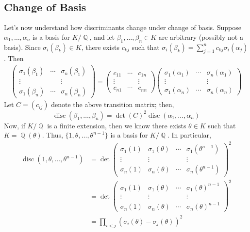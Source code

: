 \documentclass[11pt, a4paper]{memoir}
\DeclareMathOperator{\Q}{{\mathbb{Q}}}
\theoremstyle{change}
\theoremstyle{plain}
\theoremstyle{nonumberplain}
\DeclareMathOperator{\disc}{disc}
\numberwithin{equation}{section}
\begin{document}
\subsection{Change of Basis}
Let's now understand how discriminants change under change of basis.
Suppose $\alpha_1,\ldots,\alpha_n$ is a basis for $K/\Q$, and let $\beta_1,\ldots,\beta_n\in K$ are arbitrary (possibly not a basis).
Since $\sigma_i(\beta_k)\in K$, there exists $c_{kj}$ such that $\sigma_i(\beta_k)=\sum_{j=1}^n c_{kj}\sigma_i(\alpha_j)$.
Then
\begin{align*}
    \begin{pmatrix}
        \sigma_1(\beta_1) &\cdots&\sigma_n(\beta_1)\\
        \vdots&&\vdots\\
        \sigma_1(\beta_n)&\cdots&\sigma_n(\beta_n)
    \end{pmatrix}
    =
    \begin{pmatrix}
        c_{11} &\cdots&c_{1n}\\
        \vdots&&\vdots\\
        c_{n1}&\cdots&c_{nn}
    \end{pmatrix}
    \begin{pmatrix}
        \sigma_1(\alpha_1) &\cdots&\sigma_n(\alpha_1)\\
        \vdots&&\vdots\\
        \sigma_1(\alpha_n)&\cdots&\sigma_n(\alpha_n)
    \end{pmatrix}
\end{align*}
Let $C=\left(c_{ij}\right)$ denote the above transition matrix; then,
\begin{equation*}
    \disc(\beta_1,\ldots,\beta_n)=\det(C)^2\disc(\alpha_1,\ldots,\alpha_n)
\end{equation*}
Now, if $K/\Q$ is a finite extension, then we know there exists $\theta\in K$ such that $K=\Q(\theta)$.
Thus, $\{1,\theta,\ldots,\theta^{n-1}\}$ is a basis for $K/\Q$.
In particular,
\begin{align*}
    \disc(1,\theta,\ldots,\theta^{n-1}) &= \det\begin{pmatrix}\sigma_1(1) &\sigma_1(\theta)&\cdots&\sigma_1(\theta^{n-1})\\\vdots&\vdots&&\vdots\\\sigma_n(1)&\sigma_n(\theta)&\cdots&\sigma_n(\theta^{n-1})\end{pmatrix}^2\\
                                        &=\det\begin{pmatrix}\sigma_1(1) &\sigma_1(\theta)&\cdots&\sigma_1(\theta)^{n-1}\\\vdots&\vdots&&\vdots\\\sigma_n(1)&\sigma_n(\theta)&\cdots&\sigma_n(\theta)^{n-1}\end{pmatrix}^2\\
                                        &= \prod_{i<j}(\sigma_i(\theta)-\sigma_j(\theta))^2
\end{align*}
\end{document}
